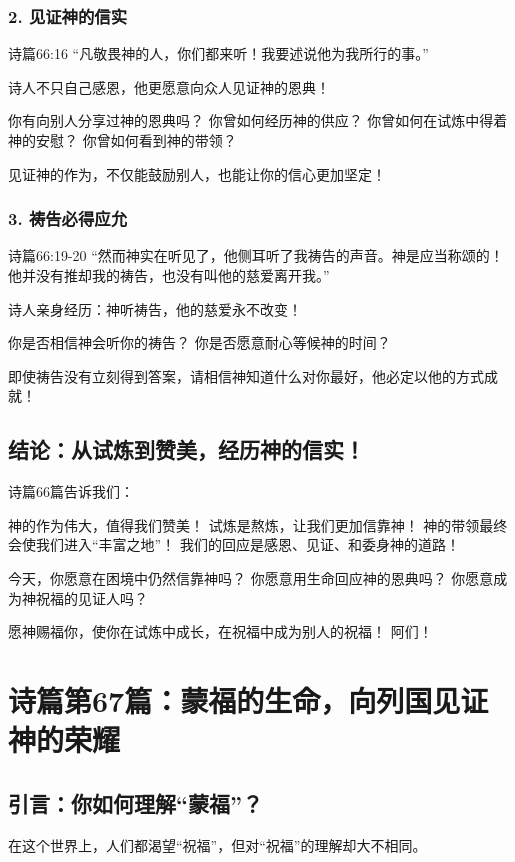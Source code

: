 \documentclass[a4paper, 12pt]{article}
\begin{document}
\subsubsection*{2. 见证神的信实}
诗篇66:16 “凡敬畏神的人，你们都来听！我要述说他为我所行的事。”

诗人不只自己感恩，他更愿意向众人见证神的恩典！

你有向别人分享过神的恩典吗？
你曾如何经历神的供应？
你曾如何在试炼中得着神的安慰？
你曾如何看到神的带领？

见证神的作为，不仅能鼓励别人，也能让你的信心更加坚定！
\subsubsection*{3. 祷告必得应允}
诗篇66:19-20 “然而神实在听见了，他侧耳听了我祷告的声音。神是应当称颂的！他并没有推却我的祷告，也没有叫他的慈爱离开我。”

诗人亲身经历：神听祷告，他的慈爱永不改变！

你是否相信神会听你的祷告？
你是否愿意耐心等候神的时间？

即使祷告没有立刻得到答案，请相信神知道什么对你最好，他必定以他的方式成就！

\subsection*{结论：从试炼到赞美，经历神的信实！}
诗篇66篇告诉我们：

神的作为伟大，值得我们赞美！
试炼是熬炼，让我们更加信靠神！
神的带领最终会使我们进入“丰富之地”！
我们的回应是感恩、见证、和委身神的道路！

今天，你愿意在困境中仍然信靠神吗？
你愿意用生命回应神的恩典吗？
你愿意成为神祝福的见证人吗？

愿神赐福你，使你在试炼中成长，在祝福中成为别人的祝福！
阿们！
\newpage
\section{诗篇第67篇：蒙福的生命，向列国见证神的荣耀}
\subsection*{引言：你如何理解“蒙福”？}
\hspace{0.6cm}在这个世界上，人们都渴望“祝福”，但对“祝福”的理解却大不相同。
\end{document}
